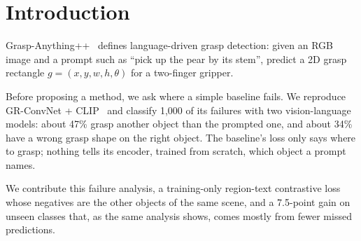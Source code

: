 \section{Introduction}
\label{sec:intro}

Grasp-Anything++~\cite{vuong2024language} defines language-driven grasp detection: given an RGB image and a prompt such as ``pick up the pear by its stem'', predict a 2D grasp rectangle $g = (x, y, w, h, \theta)$ for a two-finger gripper.

Before proposing a method, we ask where a simple baseline fails.
We reproduce GR-ConvNet + CLIP~\cite{kumra2020antipodal,vuong2024language} and classify 1,000 of its failures with two vision-language models: about 47\% grasp another object than the prompted one, and about 34\% have a wrong grasp shape on the right object.
The baseline's loss only says where to grasp; nothing tells its encoder, trained from scratch, which object a prompt names.

We contribute this failure analysis, a training-only region-text contrastive loss whose negatives are the other objects of the same scene, and a 7.5-point gain on unseen classes that, as the same analysis shows, comes mostly from fewer missed predictions.
